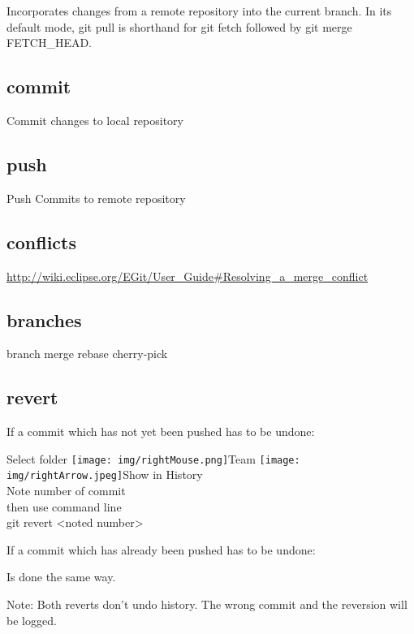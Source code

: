\documentclass{scrreprt}
\newcommand{\rightMouse}{%
\texttt{[image: img/rightMouse.png]}}
\newcommand{\rightArrow}{%
\texttt{[image: img/rightArrow.jpeg]}\hspace{1mm}}
\newcommand{\layerThree}[1]{\subsection{#1}}
\begin{document}
Incorporates changes from a remote repository into the current branch. 
In its default mode, git pull is shorthand for git fetch followed by git merge FETCH_HEAD.

\layerThree{commit}

Commit changes to local repository

\layerThree{push}

Push Commits to remote repository

\layerThree{conflicts}

\url{http://wiki.eclipse.org/EGit/User_Guide#Resolving_a_merge_conflict}

\layerThree{branches}
branch
merge
rebase
cherry-pick

\layerThree{revert}

If a commit which has not yet been pushed has to be undone:

Select folder \rightMouse Team \rightArrow Show in History \\
Note number of commit
\\ then use command line \\
{\ttfamily git revert <noted number>}

\vspace{5mm}
\noindent If a commit which has already been pushed has to be undone:

Is done the same way.

\vspace{5mm}
\noindent Note: Both reverts don't undo history. The wrong commit and the reversion will
be logged.



\nocite{*}

\clearpage
{}
{}


\end{document}
